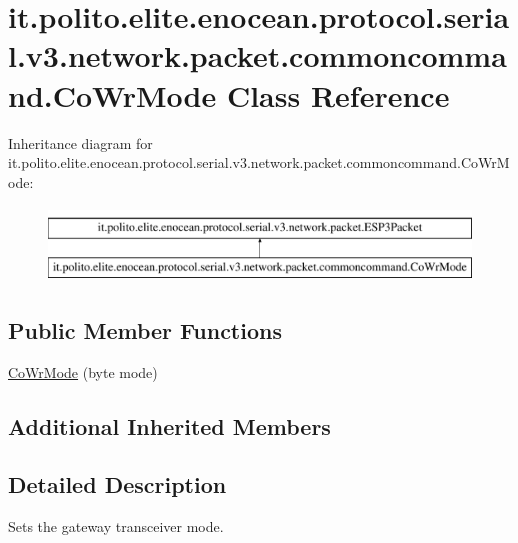 \hypertarget{classit_1_1polito_1_1elite_1_1enocean_1_1protocol_1_1serial_1_1v3_1_1network_1_1packet_1_1commoncommand_1_1_co_wr_mode}{}\section{it.\+polito.\+elite.\+enocean.\+protocol.\+serial.\+v3.\+network.\+packet.\+commoncommand.\+Co\+Wr\+Mode Class Reference}
\label{classit_1_1polito_1_1elite_1_1enocean_1_1protocol_1_1serial_1_1v3_1_1network_1_1packet_1_1commoncommand_1_1_co_wr_mode}
Inheritance diagram for it.\+polito.\+elite.\+enocean.\+protocol.\+serial.\+v3.\+network.\+packet.\+commoncommand.\+Co\+Wr\+Mode\+:\begin{figure}[H]
\begin{center}
\leavevmode
\includegraphics[height=2.000000cm]{classit_1_1polito_1_1elite_1_1enocean_1_1protocol_1_1serial_1_1v3_1_1network_1_1packet_1_1commoncommand_1_1_co_wr_mode}
\end{center}
\end{figure}
\subsection*{Public Member Functions}
\begin{DoxyCompactItemize}
\item 
\hyperlink{classit_1_1polito_1_1elite_1_1enocean_1_1protocol_1_1serial_1_1v3_1_1network_1_1packet_1_1commoncommand_1_1_co_wr_mode_aa8cd9f7f4f657d51a7f342b4f2572e91}{Co\+Wr\+Mode} (byte mode)
\end{DoxyCompactItemize}
\subsection*{Additional Inherited Members}


\subsection{Detailed Description}
Sets the gateway transceiver mode.

